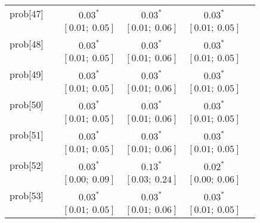 \begin{table}
\begin{center}
\begin{tabular}{l c c c c c }
prob[47]    &                                  & $0.03^{*}$                & $0.03^{*}$                & $0.03^{*}$              &                         \\
            &                                  & $[0.01;\ 0.05]$           & $[0.01;\ 0.06]$           & $[0.01;\ 0.05]$         &                         \\
prob[48]    &                                  & $0.03^{*}$                & $0.03^{*}$                & $0.03^{*}$              &                         \\
            &                                  & $[0.01;\ 0.05]$           & $[0.01;\ 0.06]$           & $[0.01;\ 0.05]$         &                         \\
prob[49]    &                                  & $0.03^{*}$                & $0.03^{*}$                & $0.03^{*}$              &                         \\
            &                                  & $[0.01;\ 0.05]$           & $[0.01;\ 0.06]$           & $[0.01;\ 0.05]$         &                         \\
prob[50]    &                                  & $0.03^{*}$                & $0.03^{*}$                & $0.03^{*}$              &                         \\
            &                                  & $[0.01;\ 0.05]$           & $[0.01;\ 0.06]$           & $[0.01;\ 0.05]$         &                         \\
prob[51]    &                                  & $0.03^{*}$                & $0.03^{*}$                & $0.03^{*}$              &                         \\
            &                                  & $[0.01;\ 0.05]$           & $[0.01;\ 0.06]$           & $[0.01;\ 0.05]$         &                         \\
prob[52]    &                                  & $0.03^{*}$                & $0.13^{*}$                & $0.02^{*}$              &                         \\
            &                                  & $[0.00;\ 0.09]$           & $[0.03;\ 0.24]$           & $[0.00;\ 0.06]$         &                         \\
prob[53]    &                                  & $0.03^{*}$                & $0.03^{*}$                & $0.03^{*}$              &                         \\
            &                                  & $[0.01;\ 0.05]$           & $[0.01;\ 0.06]$           & $[0.01;\ 0.05]$         &                         \\

\end{tabular}
\end{center}
\end{table}
